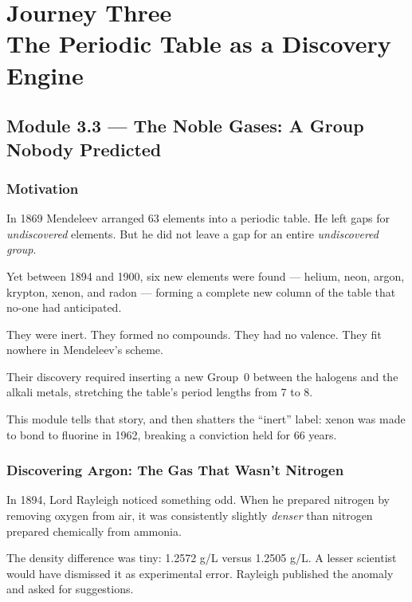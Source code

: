 \documentclass[12pt, a4paper]{book}
\begin{document}
\setcounter{chapter}{2}
\chapter[Journey 3 --- The Periodic Table as a Discovery Engine]
        {Journey Three\\[8pt]
         \textcolor{ModuleColor}{\large The Periodic Table as a Discovery Engine}}
\setcounter{section}{2}

\section{Module 3.3 --- The Noble Gases: A Group Nobody Predicted}
\label{sec:mod3.3}

\subsection*{Motivation}

In 1869 Mendeleev arranged 63 elements into a periodic table.
He left gaps for \emph{undiscovered} elements.
But he did not leave a gap for an entire \emph{undiscovered group}.

Yet between 1894 and 1900, six new elements were found ---
helium, neon, argon, krypton, xenon, and radon ---
forming a complete new column of the table that no-one
had anticipated.

They were inert. They formed no compounds.
They had no valence. They fit nowhere in Mendeleev's scheme.

Their discovery required inserting a new Group~0 between
the halogens and the alkali metals,
stretching the table's period lengths from 7 to 8.

This module tells that story,
and then shatters the ``inert'' label:
xenon was made to bond to fluorine in 1962,
breaking a conviction held for 66 years.

\subsection{Discovering Argon: The Gas That Wasn't Nitrogen}

In 1894, Lord Rayleigh noticed something odd.
When he prepared nitrogen by removing oxygen from air,
it was consistently slightly \emph{denser} than nitrogen
prepared chemically from ammonia.

The density difference was tiny: 1.2572 g/L versus 1.2505 g/L.
A lesser scientist would have dismissed it as experimental error.
Rayleigh published the anomaly and asked for suggestions.
\end{document}
